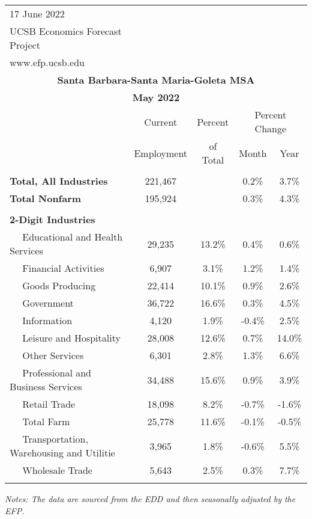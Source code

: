 \documentclass[12pt]{article}
\begin{document}
\begin{landscape}
\begin{table}
\begin{tabular}{|l|c|c|c|c|}
\multicolumn{1}{l}{\small 17 June 2022} & \multicolumn{4}{c}{} \\
\multicolumn{1}{l}{\small UCSB Economics Forecast Project} & \multicolumn{4}{c}{} \\
\multicolumn{1}{l}{\small www.efp.ucsb.edu} & \multicolumn{4}{c}{} \\
\multicolumn{5}{c}{\large \textbf{Santa Barbara-Santa Maria-Goleta MSA}} \\
\multicolumn{5}{c}{\large \textbf{May 2022}} \
\multicolumn{5}{l}{\small Data Seasonally Adjusted} \\ \hline \hline
& Current & Percent & \multicolumn{2}{c}{Percent Change} \vline \\
& Employment & of Total & Month & Year \\ \hline
&&&& \\
\textbf{Total, All Industries} & 221,467 && 0.2\% & 3.7\% \\
\textbf{Total Nonfarm} & 195,924 && 0.3\% & 4.3\% \\
&&&& \\
\textbf{2-Digit Industries} &&&& \\
$\quad$ Educational and Health Services & 29,235 & 13.2\% & 0.4\% & 0.6\% \\
$\quad$ Financial Activities & 6,907 & 3.1\% & 1.2\% & 1.4\% \\
$\quad$ Goods Producing & 22,414 & 10.1\% & 0.9\% & 2.6\% \\
$\quad$ Government & 36,722 & 16.6\% & 0.3\% & 4.5\% \\
$\quad$ Information & 4,120 & 1.9\% & -0.4\% & 2.5\% \\
$\quad$ Leisure and Hospitality & 28,008 & 12.6\% & 0.7\% & 14.0\% \\
$\quad$ Other Services & 6,301 & 2.8\% & 1.3\% & 6.6\% \\
$\quad$ Professional and Business Services & 34,488 & 15.6\% & 0.9\% & 3.9\% \\
$\quad$ Retail Trade & 18,098 & 8.2\% & -0.7\% & -1.6\% \\
$\quad$ Total Farm & 25,778 & 11.6\% & -0.1\% & -0.5\% \\
$\quad$ Transportation, Warehousing and Utilitie & 3,965 & 1.8\% & -0.6\% & 5.5\% \\
$\quad$ Wholesale Trade & 5,643 & 2.5\% & 0.3\% & 7.7\% \\
&&&& \\ \hline \hline
\end{tabular}
\par
\vspace{.5em}
\footnotesize
\textit{Notes: The data are sourced from the EDD and then seasonally adjusted by the EFP.}
\end{table}
\end{landscape}
\end{document}
